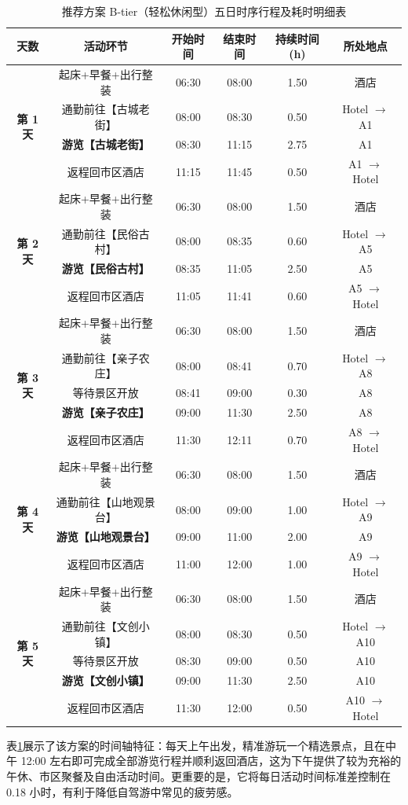 \documentclass{cumcmthesis}
\begin{document}
\begin{table}[htbp]
\centering
\caption{推荐方案 B-tier（轻松休闲型）五日时序行程及耗时明细表}
\label{tab:timeline_b}
\small
\begin{tabular}{cccccc}
\toprule
天数 & 活动环节 & 开始时间 & 结束时间 & 持续时间(h) & 所处地点 \\
\midrule
\multirow{4}{*}{\textbf{第 1 天}} & 起床+早餐+出行整装 & 06:30 & 08:00 & 1.50 & 酒店 \\
& 通勤前往【古城老街】 & 08:00 & 08:30 & 0.50 & Hotel $\to$ A1 \\
& \textbf{游览【古城老街】} & 08:30 & 11:15 & 2.75 & A1 \\
& 返程回市区酒店 & 11:15 & 11:45 & 0.50 & A1 $\to$ Hotel \\
\midrule
\multirow{4}{*}{\textbf{第 2 天}} & 起床+早餐+出行整装 & 06:30 & 08:00 & 1.50 & 酒店 \\
& 通勤前往【民俗古村】 & 08:00 & 08:35 & 0.60 & Hotel $\to$ A5 \\
& \textbf{游览【民俗古村】} & 08:35 & 11:05 & 2.50 & A5 \\
& 返程回市区酒店 & 11:05 & 11:41 & 0.60 & A5 $\to$ Hotel \\
\midrule
\multirow{5}{*}{\textbf{第 3 天}} & 起床+早餐+出行整装 & 06:30 & 08:00 & 1.50 & 酒店 \\
& 通勤前往【亲子农庄】 & 08:00 & 08:41 & 0.70 & Hotel $\to$ A8 \\
& 等待景区开放 & 08:41 & 09:00 & 0.30 & A8 \\
& \textbf{游览【亲子农庄】} & 09:00 & 11:30 & 2.50 & A8 \\
& 返程回市区酒店 & 11:30 & 12:11 & 0.70 & A8 $\to$ Hotel \\
\midrule
\multirow{4}{*}{\textbf{第 4 天}} & 起床+早餐+出行整装 & 06:30 & 08:00 & 1.50 & 酒店 \\
& 通勤前往【山地观景台】 & 08:00 & 09:00 & 1.00 & Hotel $\to$ A9 \\
& \textbf{游览【山地观景台】} & 09:00 & 11:00 & 2.00 & A9 \\
& 返程回市区酒店 & 11:00 & 12:00 & 1.00 & A9 $\to$ Hotel \\
\midrule
\multirow{5}{*}{\textbf{第 5 天}} & 起床+早餐+出行整装 & 06:30 & 08:00 & 1.50 & 酒店 \\
& 通勤前往【文创小镇】 & 08:00 & 08:30 & 0.50 & Hotel $\to$ A10 \\
& 等待景区开放 & 08:30 & 09:00 & 0.50 & A10 \\
& \textbf{游览【文创小镇】} & 09:00 & 11:30 & 2.50 & A10 \\
& 返程回市区酒店 & 11:30 & 12:00 & 0.50 & A10 $\to$ Hotel \\
\bottomrule
\end{tabular}
\end{table}
表\ref{tab:timeline_b}展示了该方案的时间轴特征：每天上午出发，精准游玩一个精选景点，且在中午 12:00 左右即可完成全部游览行程并顺利返回酒店，这为下午提供了较为充裕的午休、市区聚餐及自由活动时间。更重要的是，它将每日活动时间标准差控制在 0.18 小时，有利于降低自驾游中常见的疲劳感。
\end{document}
